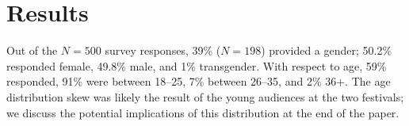\documentclass{sig-alternate}
\begin{document}
\section{Results}

Out of the $N=500$ survey responses, 39\% ($N=198$) provided a gender; 50.2\% responded female, 49.8\% male, and 1\% transgender.  With respect to age, 59\% responded, 91\% were between 18--25, 7\% between 26--35, and 2\% 36+.  The age distribution skew was likely the result of the young audiences at the two festivals; we discuss the potential implications of this distribution at the end of the paper.

\end{document}
